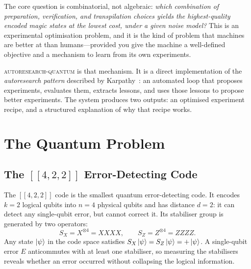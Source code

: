 \documentclass[11pt,a4paper]{article}
\begin{document}
\begin{keyconcept}
The core question is combinatorial, not algebraic: \emph{which combination of
preparation, verification, and transpilation choices yields the
highest-quality encoded magic states at the lowest cost, under a given noise
model?} This is an experimental optimisation problem, and it is the kind of
problem that machines are better at than humans---provided you give the
machine a well-defined objective and a mechanism to learn from its own
experiments.
\end{keyconcept}

\textsc{autoresearch-quantum} is that mechanism. It is a direct
implementation of the \emph{autoresearch pattern} described by
Karpathy~\cite{karpathy2025}: an automated loop that proposes experiments,
evaluates them, extracts lessons, and uses those lessons to propose better
experiments. The system produces two outputs: an optimised experiment recipe,
and a structured explanation of why that recipe works.

\section{The Quantum Problem}
\label{sec:quantum}

\subsection{\texorpdfstring{The $[\![4,2,2]\!]$ Error-Detecting Code}{The [[4,2,2]] Error-Detecting Code}}
\label{sec:code}

The $[\![4,2,2]\!]$ code is the smallest quantum error-detecting code. It
encodes $k = 2$ logical qubits into $n = 4$ physical qubits and has distance
$d = 2$: it can detect any single-qubit error, but cannot correct it. Its
stabiliser group is generated by two operators:
\begin{equation}
  S_X = X^{\otimes 4} = XXXX, \qquad S_Z = Z^{\otimes 4} = ZZZZ.
  \label{eq:stabilizers}
\end{equation}
Any state $\ket{\psi}$ in the code space satisfies $S_X\ket{\psi} =
S_Z\ket{\psi} = +\ket{\psi}$. A single-qubit error $E$ anticommutes with at
least one stabiliser, so measuring the stabilisers reveals whether an error
occurred without collapsing the logical information.
\end{document}
